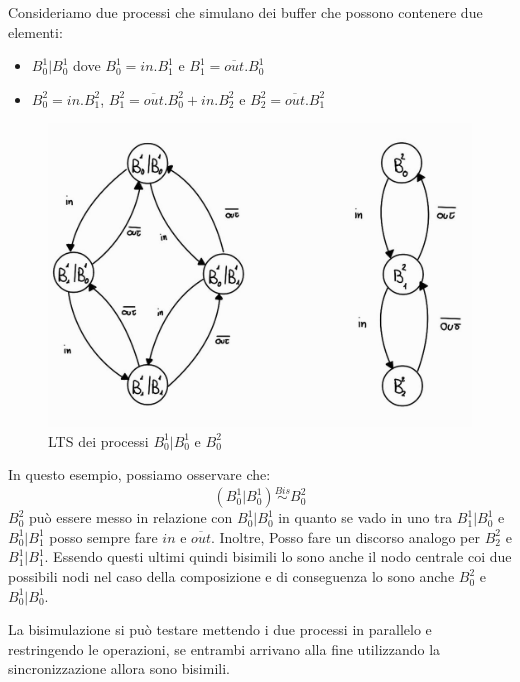 \begin{esempio}
    Consideriamo due processi che simulano dei buffer che possono contenere due
    elementi:
    \begin{itemize}
        \item $B_0^1 | B_0^1$ dove $B_0^1 = in . B_1^1$ e $B_1^1 =
                  \overline{out} . B_0^1$
        \item $B_0^2 = in . B_1^2$, $B_1^2= \overline{out} . B_0^2 + in
                  . B_2^2$ e $B_2^2 = \overline{out} . B_1^2$
    \end{itemize}
    \begin{figure}[!ht]
        \centering
        \includegraphics[scale=0.25]{img/ccs/Esempio 2.png}
        \caption{LTS dei processi $B_0^1 | B_0^1$ e $B_0^2$}
    \end{figure}
    In questo esempio, possiamo osservare che: $$(B_0^1 | B_0^1) \stackrel{Bis}{\sim} B_0^2$$
    $B_0^2$ può essere messo in relazione con $B_0^1| B_0^1$ in quanto se vado
    in uno tra $B_1^1 | B_0^1$ e $B_0^1 | B_1^1$ posso sempre fare $in$ e $\overline{out}$.
    Inoltre, Posso fare un discorso analogo per $B_2^2$ e $B_1^1 | B_1^1$.
    Essendo questi ultimi quindi bisimili lo sono anche il nodo centrale coi
    due possibili nodi nel caso della composizione e di conseguenza lo sono
    anche $B_0^2$ e $B_0^1 | B_0^1$.
\end{esempio}
La bisimulazione si può testare mettendo i due processi in parallelo e restringendo
le operazioni, se entrambi arrivano alla fine utilizzando la sincronizzazione
allora sono bisimili.
